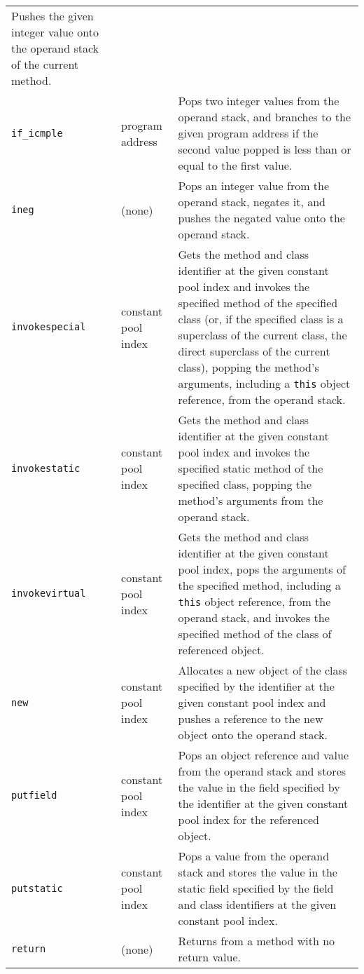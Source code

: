 {\begin{supertabular}{llp{8cm}}
    Pushes the given integer value onto the operand stack of the
    current method.
    \\
    \texttt{if\_icmple} & program address &
    Pops two integer values from the operand stack, and branches to
    the given program address if the second value popped is less than
    or equal to the first value.
    \\
    \texttt{ineg} & (none) &
    Pops an integer value from the operand stack, negates it, and
    pushes the negated value onto the operand stack.
    \\
    \texttt{invokespecial} & constant pool index &
    Gets the method and class identifier at the given constant pool
    index and invokes the specified method of the specified class (or,
    if the specified class is a superclass of the current class, the
    direct superclass of the current class), popping the method's
    arguments, including a \texttt{this} object reference, from the
    operand stack.
    \\
    \texttt{invokestatic} & constant pool index &
    Gets the method and class identifier at the given constant pool
    index and invokes the specified static method of the specified
    class, popping the method's arguments from the operand stack.
    \\
    \texttt{invokevirtual} & constant pool index &
    Gets the method and class identifier at the given constant pool
    index, pops the arguments of the specified method, including a
    \texttt{this} object reference, from the operand stack, and
    invokes the specified method of the class of referenced object.
    \\
    \texttt{new} & constant pool index &
    Allocates a new object of the class specified by the identifier at
    the given constant pool index and pushes a reference to the new
    object onto the operand stack.
    \\
    \texttt{putfield} & constant pool index &
    Pops an object reference and value from the operand stack and
    stores the value in the field specified by the identifier at the
    given constant pool index for the referenced object.
    \\
    \texttt{putstatic} & constant pool index &
    Pops a value from the operand stack and stores the value in the
    static field specified by the field and class identifiers at the
    given constant pool index.
    \\
    \texttt{return} & (none) &
    Returns from a method with no return value.
    \\
  \end{supertabular}
  \vspace{\textfloatsep}
}

